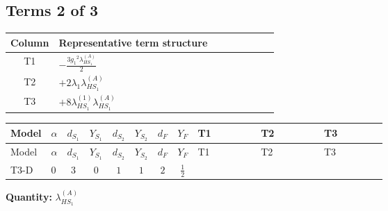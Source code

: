 \documentclass[8pt]{article}
\begin{document}
\begin{landscape}
\subsection*{Terms 2 of 3}
\begin{center}
\begin{tabular}{@{}c >{\raggedright\arraybackslash}p{0.82\linewidth}@{}}
\toprule
Column & Representative term structure \\
\midrule
T1 & \(\displaystyle -\frac{3 {g_1}^2 {\lambda_{HS_1}^{(A)}}}{2}\) \\
\midrule
T2 & \(\displaystyle +2 {\lambda_1} {\lambda_{HS_1}^{(A)}}\) \\
\midrule
T3 & \(\displaystyle +8 {\lambda_{HS_1}^{(1)}} {\lambda_{HS_1}^{(A)}}\) \\
\midrule
\bottomrule
\end{tabular}
\end{center}
\smallskip
\tiny
\begin{longtable}{@{}llcccccc >{\raggedright\arraybackslash}p{0.21\linewidth} >{\raggedright\arraybackslash}p{0.21\linewidth} >{\raggedright\arraybackslash}p{0.21\linewidth}@{}}
\toprule
Model & $\alpha$ & $d_{S_1}$ & $Y_{S_1}$ & $d_{S_2}$ & $Y_{S_2}$ & $d_F$ & $Y_F$ & T1 & T2 & T3 \\
\midrule
\endfirsthead
\toprule
Model & $\alpha$ & $d_{S_1}$ & $Y_{S_1}$ & $d_{S_2}$ & $Y_{S_2}$ & $d_F$ & $Y_F$ & T1 & T2 & T3 \\
\midrule
\endhead
T3-D & $0$ & $3$ & $0$ & $1$ & $1$ & $2$ & $\frac{1}{2}$ & \scriptsize\adjustbox{max width=\linewidth}{$\begin{gathered} -\frac{3 {g_1}^2 {\lambda_{HS_1}^{(A)}}}{2}\end{gathered}$} & \scriptsize\adjustbox{max width=\linewidth}{$\begin{gathered} +2 {\lambda_1} {\lambda_{HS_1}^{(A)}}\end{gathered}$} & \scriptsize\adjustbox{max width=\linewidth}{$\begin{gathered} +8 {\lambda_{HS_1}^{(1)}} {\lambda_{HS_1}^{(A)}}\end{gathered}$} \\
\midrule
\bottomrule
\end{longtable}
\clearpage
\noindent\textbf{Quantity: }$\lambda_{HS_1}^{(A)}$\par\smallskip

\end{landscape}
\end{document}
